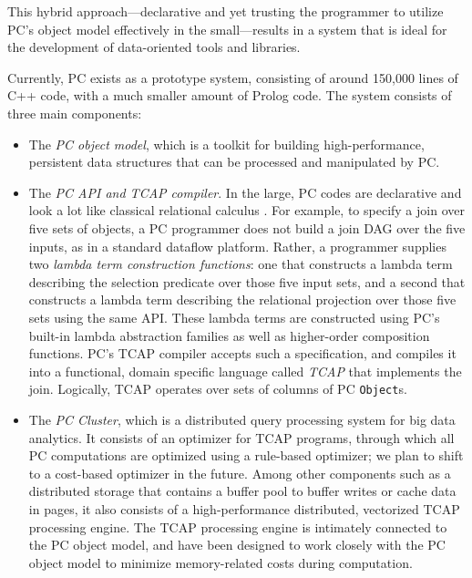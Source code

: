 This hybrid approach---declarative and yet trusting the programmer
to utilize PC's object model effectively
in the small---results in a system that is ideal for the 
development of data-oriented tools and libraries.

Currently, PC exists as a prototype system, consisting of around
150,000 lines of C++ code, with a much smaller amount of Prolog code.
The system consists of three main components: 

\begin{itemize}
\item The \emph{PC object model}, which is a toolkit for building high-performance, persistent data structures that can be 
processed and manipulated by PC.  

\item The \emph{PC API and TCAP compiler}.  In the large, PC codes are declarative and look a lot like classical relational calculus \cite{codd1971data}.  For example, to specify a join over five sets of objects, a PC programmer does not build a join DAG over the five inputs, as in a standard
dataflow platform.  Rather, a programmer 
supplies two \emph{lambda term construction functions}: one that constructs a lambda term describing the selection
predicate over those five input sets, 
and a second that constructs a lambda term describing the relational projection over those five sets
using the same API.  These lambda terms are constructed using PC's built-in lambda abstraction families as well as higher-order composition functions.
 PC's TCAP compiler 
accepts such a specification, and compiles it into a functional, domain specific language called \emph{TCAP} that implements
the join.  Logically, TCAP operates over
sets of columns of PC \texttt{Object}s. 

\item The \emph{PC Cluster}, which is a distributed query processing
  system for big data analytics. It consists of an optimizer for TCAP
  programs, through which all PC computations are optimized using a rule-based
optimizer; we plan to shift to a cost-based optimizer in the
future. Among other components such as a distributed storage that
contains a buffer pool to buffer writes or cache data in pages, it also consists of a
high-performance distributed, vectorized TCAP processing engine. 
The TCAP processing engine is intimately connected to the PC object model, 
and have been designed to work closely with the PC object model to minimize memory-related costs during computation.


\end{itemize}

